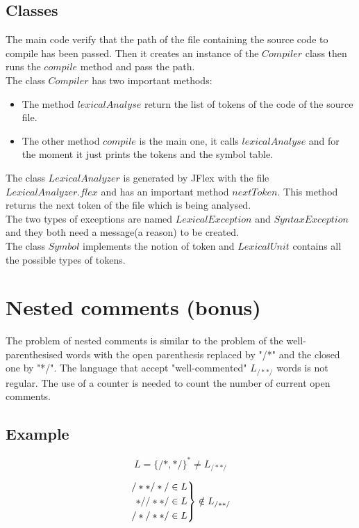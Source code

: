 \documentclass{article}
\begin{document}
\subsection{Classes}
\hspace{0.5cm} The main code verify that the path of the file containing the source code to compile has been passed. Then it creates an instance of the $Compiler$ class then runs the $compile$ method and pass the path.\\

The class $Compiler$ has two important methods:
\begin{itemize}
\item The method $lexicalAnalyse$ return the list of tokens of the code of the source file.
\item The other method $compile$ is the main one, it calls $lexicalAnalyse$ and for the moment it just prints the tokens and the symbol table.
\end{itemize}

The class $LexicalAnalyzer$ is generated by JFlex with the file $LexicalAnalyzer.flex$ and has an important method $nextToken$. This method returns the next token of the file which is being analysed.\\

The two types of exceptions are named $LexicalException$ and $SyntaxException$ and they both need a message(a reason) to be created.\\

The class $Symbol$ implements the notion of token and $LexicalUnit$ contains all the possible types of tokens.

\section{Nested comments (bonus)}
The problem of nested comments is similar to the problem of the well-parenthesised words with the open parenthesis replaced by "/*" and the closed one by "*/". The language that accept "well-commented" $L_{/**/}$ words is not regular. The use of a counter is needed to count the number of current open comments.

\subsection{Example}
$$
L = \{/*,*/\}^* \ne L_{/**/}
$$

\begin{equation}
  \notag
  \left.\begin{aligned}
  /**/*/\in L\\
  *//**/\in L\\
  /*/**/\in L
\end{aligned}\right\} \notin L_{/**/}
\end{equation}
\end{document}
